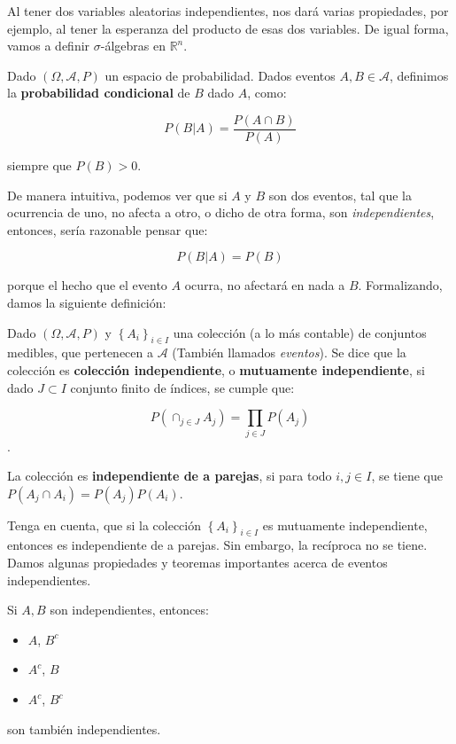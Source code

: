 Al tener dos variables aleatorias independientes, nos dará varias propiedades, por ejemplo, al tener la esperanza del producto de esas dos variables. De igual forma, vamos a definir $\sigma$-álgebras en $\mathbb{R}^n$.

\begin{boxDef}
	Dado $(\Omega, \mathcal{A}, P)$ un espacio de probabilidad. Dados eventos $A, B \in \mathcal{A}$, definimos la \textbf{probabilidad condicional} de $B$ dado $A$, como:

	\[
		P(B \vert A) = \frac{P(A \cap B)}{P(A)}
	\]

	siempre que $P(B) > 0$.

\end{boxDef}

De manera intuitiva, podemos ver que si $A$ y $B$ son dos eventos, tal que la ocurrencia de uno, no afecta a otro, o dicho de otra forma, son \textit{independientes}, entonces, sería razonable pensar que:

\[
	P(B \vert A) = P(B)
\]

porque el hecho que el evento $A$ ocurra, no afectará en nada a $B$. Formalizando, damos la siguiente definición:

\begin{boxDef}

	Dado $(\Omega, \mathcal{A}, P)$ y $\left\{ A_i \right\}_{i \in I}$ una colección (a lo más contable) de conjuntos medibles, que pertenecen a $\mathcal{A}$ (También llamados \textit{eventos}). Se dice que la colección es \textbf{colección independiente}, o \textbf{mutuamente independiente}, si dado $J \subset I$ conjunto finito de índices, se cumple que:

	\[
		P \left( \cap_{j \in J} A_j \right) = \prod_{j \in J} P(A_j)
	\].

	La colección es \textbf{independiente de a parejas}, si para todo $i, j \in I$, se tiene que $P(A_j \cap A_i) = P(A_j) P(A_i)$. 
	
\end{boxDef}

Tenga en cuenta, que si la colección $\left\{ A_i \right\}_{i \in I}$ es mutuamente independiente, entonces es independiente de a parejas. Sin embargo, la recíproca no se tiene.\\

Damos algunas propiedades y teoremas importantes acerca de eventos independientes.

\begin{theorem}
	Si $A, B$ son independientes, entonces:

	\begin{itemize}
		\item $A$, $B^c$
		\item $A^c$, $B$
		\item $A^c$, $B^c$	
	\end{itemize}

	son también independientes.

\end{theorem}


